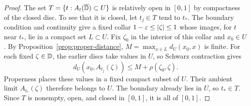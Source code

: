 \begin{proof}
The set $T=\{t:A_t(\overline{\mathbb D})\subset U\}$ is relatively open in $[0,1]$
by compactness of the closed disc.  To see that it is closed, let
$t_j\in T$ tend to $t_*$.  The boundary condition and continuity give a
fixed collar $1-\varepsilon\leq|\zeta|\leq1$ whose images, for $t$ near $t_*$,
lie in a compact set $L\subset U$.  Fix $\zeta_0$ in the interior of this
collar and $x_0\in U$.  By Proposition~\ref{prop:proper-distance},
$M=\max_{x\in L}d_U(x_0,x)$ is finite.  For each fixed $\zeta\in\mathbb D$,
the earlier discs take values in $U$, so Schwarz contraction gives
\[
  d_U(x_0,A_{t_j}(\zeta))
            \leq M+\rho(\zeta_0,\zeta).
\]
Properness places these values in a fixed compact subset of $U$.
Their ambient limit $A_{t_*}(\zeta)$ therefore belongs to $U$.
The boundary already lies in $U$, so $t_*\in T$.  Since $T$ is nonempty,
open, and closed in $[0,1]$, it is all of $[0,1]$.
\end{proof}
